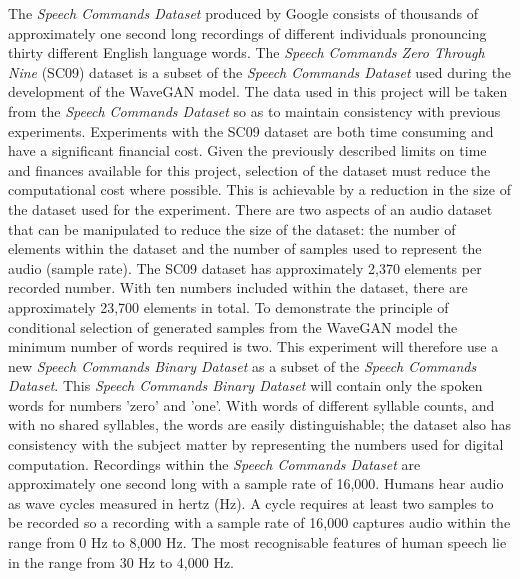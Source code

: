 \documentclass[a4paper, dvipsnames, titlepage]{article}
\begin{document}
The \textit{Speech Commands Dataset} \citep{speechcommands} produced by Google consists of thousands of approximately one second long recordings of different individuals pronouncing thirty different English language words.
The \textit{Speech Commands Zero Through Nine} (SC09) dataset is a subset of the \textit{Speech Commands Dataset} used during the development of the WaveGAN model.
The data used in this project will be taken from the \textit{Speech Commands Dataset} so as to maintain consistency with previous experiments.
\newline
\newline
Experiments with the SC09 dataset are both time consuming and have a significant financial cost.
Given the previously described limits on time and finances available for this project, selection of the dataset must reduce the computational cost where possible.
This is achievable by a reduction in the size of the dataset used for the experiment.
There are two aspects of an audio dataset that can be manipulated to reduce the size of the dataset: the number of elements within the dataset and the number of samples used to represent the audio (sample rate).
\newline
\newline
The SC09 dataset has approximately 2,370 elements per recorded number.
With ten numbers included within the dataset, there are approximately 23,700 elements in total.
To demonstrate the principle of conditional selection of generated samples from the WaveGAN model the minimum number of words required is two.
This experiment will therefore use a new \textit{Speech Commands Binary Dataset} as a subset of the \textit{Speech Commands Dataset}.
\newline
\newline
This \textit{Speech Commands Binary Dataset} will contain only the spoken words for numbers 'zero' and 'one'.
With words of different syllable counts, and with no shared syllables, the words are easily distinguishable; the dataset also has consistency with the subject matter by representing the numbers used for digital computation.
\newline
\newline
Recordings within the \textit{Speech Commands Dataset} are approximately one second long with a sample rate of 16,000.
Humans hear audio as wave cycles measured in hertz (Hz).
A cycle requires at least two samples to be recorded so a recording with a sample rate of 16,000 captures audio within the range from 0 Hz to 8,000 Hz.
The most recognisable features of human speech lie in the range from 30 Hz to 4,000 Hz.
\end{document}

